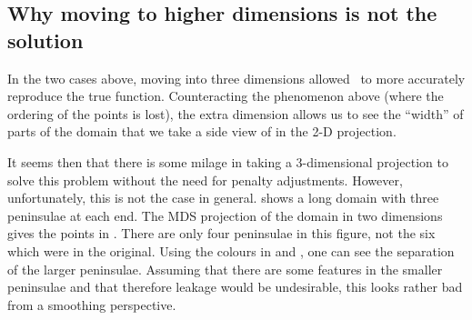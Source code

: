 {%


\subsection{Why moving to higher dimensions is not the solution}
\label{nohigherdim}

In the two cases above, moving into three dimensions allowed \mdsap\ to more accurately reproduce the true function. Counteracting the phenomenon above (where the ordering of the points is lost), the extra dimension allows us to see the ``width'' of parts of the domain that we take a side view of in the 2-D projection.

It seems then that there is some milage in taking a 3-dimensional projection to solve this problem without the need for penalty adjustments. However, unfortunately, this is not the case in general.  shows a long domain with three peninsulae at each end. The MDS projection of the domain in two dimensions gives the points in . There are only four peninsulae in this figure, not the six which were in the original. Using the colours in  and , one can see the separation of the larger peninsulae. Assuming that there are some features in the smaller peninsulae and that therefore leakage would be undesirable, this looks rather bad from a smoothing perspective.

}
